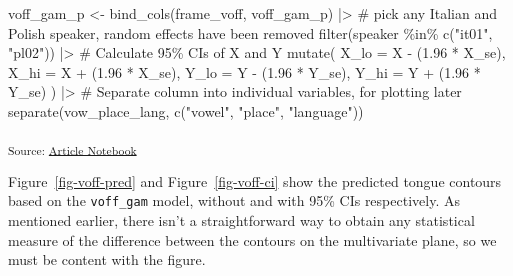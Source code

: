 \documentclass[
  man,
  longtable,
  nolmodern,
  notxfonts,
  notimes,
  colorlinks=true,linkcolor=blue,citecolor=blue,urlcolor=blue]{apa7}
\newenvironment{Shaded}{\begin{snugshade}}{\end{snugshade}}
\newcommand{\AttributeTok}[1]{\textcolor[rgb]{0.40,0.45,0.13}{#1}}
\newcommand{\CommentTok}[1]{\textcolor[rgb]{0.37,0.37,0.37}{#1}}
\newcommand{\FloatTok}[1]{\textcolor[rgb]{0.68,0.00,0.00}{#1}}
\newcommand{\FunctionTok}[1]{\textcolor[rgb]{0.28,0.35,0.67}{#1}}
\newcommand{\NormalTok}[1]{\textcolor[rgb]{0.00,0.23,0.31}{#1}}
\newcommand{\OtherTok}[1]{\textcolor[rgb]{0.00,0.23,0.31}{#1}}
\newcommand{\SpecialCharTok}[1]{\textcolor[rgb]{0.37,0.37,0.37}{#1}}
\newcommand{\StringTok}[1]{\textcolor[rgb]{0.13,0.47,0.30}{#1}}
\begin{document}
\begin{Shaded}
\begin{Highlighting}[]
\NormalTok{voff\_gam\_p }\OtherTok{\textless{}{-}} \FunctionTok{bind\_cols}\NormalTok{(frame\_voff, voff\_gam\_p) }\SpecialCharTok{|\textgreater{}} 
  \CommentTok{\# pick any Italian and Polish speaker, random effects have been removed}
  \FunctionTok{filter}\NormalTok{(speaker }\SpecialCharTok{\%in\%} \FunctionTok{c}\NormalTok{(}\StringTok{"it01"}\NormalTok{, }\StringTok{"pl02"}\NormalTok{)) }\SpecialCharTok{|\textgreater{}} 
  \CommentTok{\# Calculate 95\% CIs of X and Y}
  \FunctionTok{mutate}\NormalTok{(}
    \AttributeTok{X\_lo =}\NormalTok{ X }\SpecialCharTok{{-}}\NormalTok{ (}\FloatTok{1.96} \SpecialCharTok{*}\NormalTok{ X\_se),}
    \AttributeTok{X\_hi =}\NormalTok{ X }\SpecialCharTok{+}\NormalTok{ (}\FloatTok{1.96} \SpecialCharTok{*}\NormalTok{ X\_se),}
    \AttributeTok{Y\_lo =}\NormalTok{ Y }\SpecialCharTok{{-}}\NormalTok{ (}\FloatTok{1.96} \SpecialCharTok{*}\NormalTok{ Y\_se),}
    \AttributeTok{Y\_hi =}\NormalTok{ Y }\SpecialCharTok{+}\NormalTok{ (}\FloatTok{1.96} \SpecialCharTok{*}\NormalTok{ Y\_se)}
\NormalTok{  ) }\SpecialCharTok{|\textgreater{}} 
  \CommentTok{\# Separate column into individual variables, for plotting later}
  \FunctionTok{separate}\NormalTok{(vow\_place\_lang, }\FunctionTok{c}\NormalTok{(}\StringTok{"vowel"}\NormalTok{, }\StringTok{"place"}\NormalTok{, }\StringTok{"language"}\NormalTok{))}
\end{Highlighting}
\end{Shaded}

\textsubscript{Source:
\href{https://stefanocoretta.github.io/mv_uti/index.qmd.html}{Article
Notebook}}

Figure~\ref{fig-voff-pred} and Figure~\ref{fig-voff-ci} show the
predicted tongue contours based on the \texttt{voff\_gam} model, without
and with 95\% CIs respectively. As mentioned earlier, there isn't a
straightforward way to obtain any statistical measure of the difference
between the contours on the multivariate plane, so we must be content
with the figure.
\end{document}
